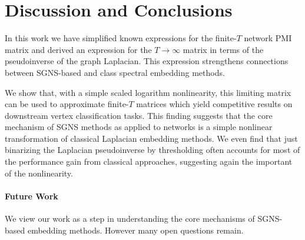 \documentclass[sigconf]{acmart}
\begin{document}

\section{Discussion and Conclusions}

In this work we have simplified known expressions for the finite-$T$ network PMI matrix and derived an expression for the $T \to \infty$ matrix in terms of the pseudoinverse of the graph Laplacian. This expression strengthens connections between SGNS-based and class spectral embedding methods.

We show that, with a simple scaled logarithm nonlinearity, this limiting matrix can be used to approximate finite-$T$ matrices which yield competitive results on downstream vertex classification tasks. This finding  suggests that the core mechanism of SGNS methods as applied to networks is a simple nonlinear transformation of classical Laplacian embedding methods. We even find that just binarizing the Laplacian pseudoinverse by thresholding often accounts for most of the performance gain from classical approaches, suggesting again the important of the nonlinearity.

\paragraph{Future Work} 
We view our work as a step in understanding the core mechanisms of SGNS-based embedding methods. However many open questions remain. 
\end{document}
